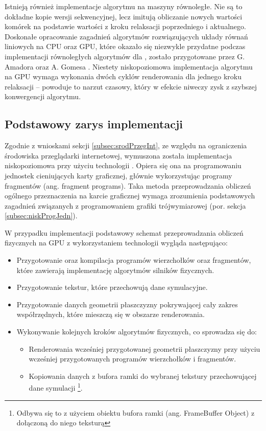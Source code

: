 Istnieją również implementacje algorytmu  na maszyny
równoległe. Nie są to dokładne kopie wersji sekwencyjnej, lecz imitują
obliczanie nowych wartości komórek na podstawie wartości z kroku relaksacji
poprzedniego i aktualnego. Doskonałe opracowanie zagadnień algorytmów
rozwiązujących układy równań liniowych na CPU oraz GPU, które okazało się
niezwykle przydatne podczas implementacji równoległych algorytmów dla \en,
zostało przygotowane przez G. Amadora oraz A. Gomesa \cite{LinSolvers}. Niestety
niskopoziomowa implementacja algorytmu  na GPU wymaga
wykonania dwóch cyklów renderowania dla jednego kroku relaksacji -- powoduje to
narzut czasowy, który w efekcie niweczy zysk z szybszej konwergencji algorytmu.

\subsection{Podstawowy zarys implementacji}

Zgodnie z wnioskami sekcji \ref{subsec:srodPrzegInt}, ze względu na ograniczenia
środowiska przeglądarki internetowej, wymuszona została implementacja
niskopoziomowa przy użyciu technologii . Opiera się ona na
programowaniu jednostek cieniujących karty graficznej, głównie wykorzystując
programy fragmentów (ang. fragment programs). Taka metoda przeprowadzania
obliczeń ogólnego przeznaczenia na karcie graficznej wymaga zrozumienia
podstawowych zagadnień związanych z programowaniem grafiki trójwymiarowej (por.
sekcja \ref{subsec:niskProgJedn}).

W przypadku implementacji  podstawowy schemat przeprowadzania
obliczeń fizycznych na GPU z wykorzystaniem technologii  wygląda
następująco:

\begin{itemize}

\item Przygotowanie oraz kompilacja programów wierzchołków oraz fragmentów,
które zawierają implementację algorytmów silników fizycznych.

\item Przygotowanie tekstur, które przechowują dane symulacyjne. 

\item Przygotowanie danych geometrii płaszczyzny pokrywającej cały zakres
współrzędnych, które mieszczą się w obszarze renderowania.

\item Wykonywanie kolejnych kroków algorytmów fizycznych, co sprowadza się do:
	
	\begin{itemize}
	\item Renderowania wcześniej przygotowanej geometrii płaszczyzny przy użyciu
	wcześniej przygotowanych programów wierzchołków i fragmentów.

    \item Kopiowania danych z bufora ramki do wybranej tekstury przechowującej
	dane symulacji \footnote{Odbywa się to z użyciem obiektu bufora ramki (ang.
	FrameBuffer Object) z dołączoną do niego teksturą}.
	\end{itemize}

\end{itemize}

